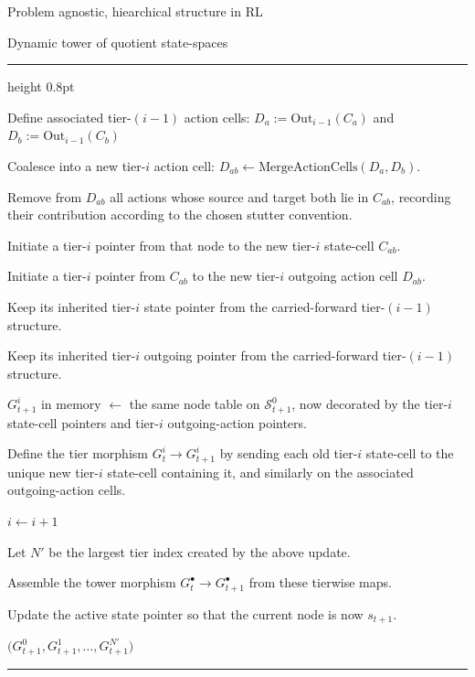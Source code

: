 \documentclass[11pt]{article}
\newenvironment{breakablealgorithm}
    {%
    \begin{center}
    \refstepcounter{algorithm}
    \hrule height 0.8pt\kern 2pt
    \renewcommand{\caption}[2][\relax]{%
        {\raggedright\textbf{Algorithm \thealgorithm: ##2}\par}
        \ifx\relax##1\relax
            \addcontentsline{loa}{algorithm}{\protect\numberline{\thealgorithm}##2}%
        \else
            \addcontentsline{loa}{algorithm}{\protect\numberline{\thealgorithm}##1}%
            \fi
        \kern 2pt\hrule\kern 2pt }
    }{%
    \kern 2pt\hrule \end{center}
    }
\begin{document}
\begin{section}{Problem agnostic, hiearchical structure in RL}
\begin{subsection}{Dynamic tower of quotient state-spaces}
\begin{breakablealgorithm}
\begin{algorithmic}[1]
                \State Define associated tier-$(i-1)$ action cells: $D_a:=\mathrm{Out}_{i-1}(C_a)$ and $D_b:=\mathrm{Out}_{i-1}(C_b)$

                \State Coalesce into a new tier-$i$ action cell:
                $
                D_{ab}\gets \mathrm{MergeActionCells}(D_a,D_b).
                $

                \State Remove from $D_{ab}$ all actions whose source and target both lie in $C_{ab}$, recording their contribution according to the chosen stutter convention.

                    \State Initiate a tier-$i$ pointer from that node to the new tier-$i$ state-cell $C_{ab}$.
                \EndFor

                \State Initiate a tier-$i$ pointer from $C_{ab}$ to the new tier-$i$ outgoing action cell $D_{ab}$.
            \EndIf
        \EndFor

                \State Keep its inherited tier-$i$ state pointer from the carried-forward tier-$(i-1)$ structure.
            \EndIf

                \State Keep its inherited tier-$i$ outgoing pointer from the carried-forward tier-$(i-1)$ structure.
            \EndIf
        \EndFor

        \State $G_{t+1}^i$ in memory $\gets$ the same node table on $\mathcal{S}_{t+1}^0$, now decorated by the tier-$i$ state-cell pointers and tier-$i$ outgoing-action pointers.

        \State Define the tier morphism
        $
        G_t^i \longrightarrow G_{t+1}^i
        $
        by sending each old tier-$i$ state-cell to the unique new tier-$i$ state-cell containing it, and similarly on the associated outgoing-action cells.

        \State $i \gets i+1$

    \EndWhile

    \State Let $N'$ be the largest tier index created by the above update.

    \State Assemble the tower morphism
    $
    G_t^\bullet \longrightarrow G_{t+1}^\bullet
    $
    from these tierwise maps.

    \State Update the active state pointer so that the current node is now $s_{t+1}$.

    \State \Return $\bigl(
    G_{t+1}^0,G_{t+1}^1,\dots,G_{t+1}^{N'}
    \bigr)$
\EndFunction

\end{algorithmic}
\end{breakablealgorithm}

\end{subsection}

\end{section}
\end{document}
